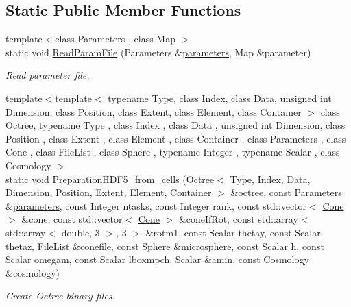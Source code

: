 \subsection*{Static Public Member Functions}
\begin{DoxyCompactItemize}
\item 
{\footnotesize template$<$class Parameters , class Map $>$ }\\static void \hyperlink{classCreate__octree_a8f2443e8281a386229cc93464fdc0a91}{Read\-Param\-File} (Parameters \&\hyperlink{rays_8h_ae1bc8b0b8c8b9f8e4cc61a5cc7c4ce9e}{parameters}, Map \&parameter)
\begin{DoxyCompactList}\small\item\em Read parameter file. \end{DoxyCompactList}\item 
{\footnotesize template$<$template$<$ typename Type, class Index, class Data, unsigned int Dimension, class Position, class Extent, class Element, class Container $>$ class Octree, typename Type , class Index , class Data , unsigned int Dimension, class Position , class Extent , class Element , class Container , class Parameters , class Cone , class File\-List , class Sphere , typename Integer , typename Scalar , class Cosmology $>$ }\\static void \hyperlink{classCreate__octree_a25467fd4c0b60a6da707e445c81e1ee7}{Preparation\-H\-D\-F5\-\_\-from\-\_\-cells} (Octree$<$ Type, Index, Data, Dimension, Position, Extent, Element, Container $>$ \&octree, const Parameters \&\hyperlink{rays_8h_ae1bc8b0b8c8b9f8e4cc61a5cc7c4ce9e}{parameters}, const Integer ntasks, const Integer rank, const std\-::vector$<$ \hyperlink{exceptionCone}{Cone} $>$ \&cone, const std\-::vector$<$ \hyperlink{exceptionCone}{Cone} $>$ \&cone\-If\-Rot, const std\-::array$<$ std\-::array$<$ double, 3 $>$, 3 $>$ \&rotm1, const Scalar thetay, const Scalar thetaz, \hyperlink{exceptionmagrathea_1_1FileList}{File\-List} \&conefile, const Sphere \&microsphere, const Scalar h, const Scalar omegam, const Scalar lboxmpch, Scalar \&amin, const Cosmology \&cosmology)
\begin{DoxyCompactList}\small\item\em Create Octree binary files. \end{DoxyCompactList}\item 

\end{DoxyCompactItemize}
